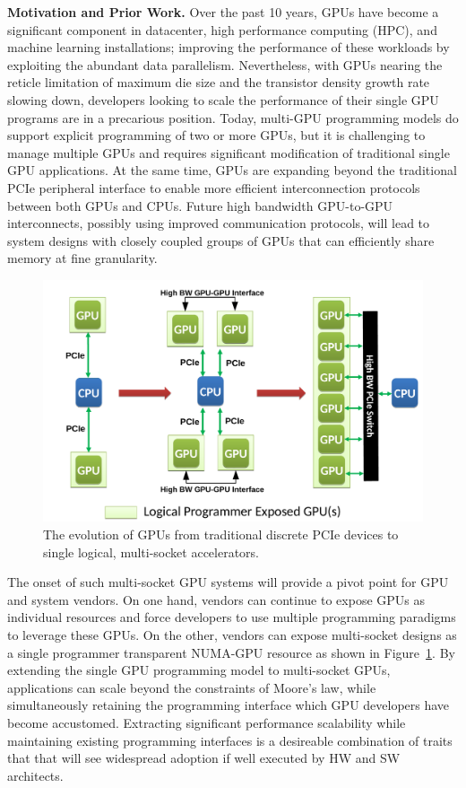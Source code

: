 \documentclass{sig-alternate}
\begin{document}
\textbf{Motivation and Prior Work.} Over the past 10 years, GPUs have become a 
significant component in datacenter, high performance computing (HPC), and 
machine learning installations; improving the performance of these workloads by 
exploiting the abundant data parallelism. Nevertheless, with GPUs nearing the 
reticle limitation of maximum die size and the transistor density growth rate 
slowing down, developers looking to scale the performance of their single GPU 
programs are in a precarious position. Today, multi-GPU programming models do 
support explicit programming of two or more GPUs, but it is challenging to 
manage multiple GPUs and requires significant modification of traditional single 
GPU applications.  At the same time, GPUs are expanding beyond the traditional 
PCIe peripheral interface to enable more efficient interconnection protocols 
between both GPUs and CPUs. Future high bandwidth GPU-to-GPU interconnects, 
possibly using improved communication protocols, will lead to system designs 
with closely coupled groups of GPUs that can efficiently share memory at fine 
granularity.

\begin{figure}[t]
	\centering
	\includegraphics[width=1.0\columnwidth]{figures/inter_gpu_connections.pdf}
	\caption{The evolution of GPUs from traditional discrete PCIe devices to 
		single logical, multi-socket accelerators.}
	\vspace{-0.6cm}
	\label{fig:systemdiagram}
\end{figure}

The onset of such multi-socket GPU systems will provide a pivot point for GPU 
and system vendors. On one hand, vendors can continue to expose GPUs as 
individual resources and force developers to use multiple programming paradigms 
to leverage these GPUs. On the other, vendors can expose multi-socket designs as 
a single programmer transparent NUMA-GPU resource as shown in 
Figure~\ref{fig:systemdiagram}.  By extending the single GPU programming model 
to multi-socket GPUs, applications can scale beyond the constraints of Moore's 
law, while simultaneously retaining the programming interface which GPU 
developers have become accustomed.  Extracting significant performance 
scalability while maintaining existing programming interfaces is a desireable 
combination of traits that that will see widespread adoption if well executed by 
HW and SW architects.
\end{document}

